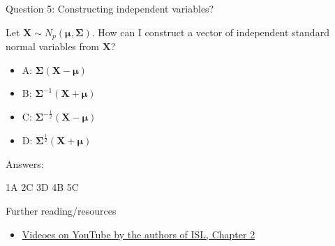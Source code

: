 \documentclass[ignorenonframetext,]{beamer}
\providecommand{\tightlist}{%
  \setlength{\itemsep}{0pt}\setlength{\parskip}{0pt}}
\begin{document}
\begin{frame}

\begin{block}{Question 5: Constructing independent variables?}

\vspace{2mm}

Let \(\mathbf{X}\sim N_p(\mathbf{\mu},\mathbf\Sigma)\). How can I
construct a vector of independent standard normal variables from
\(\mathbf{X}\)?

\begin{itemize}
\tightlist
\item
  A: \(\mathbf\Sigma(\mathbf{X}-\mathbf{\mu})\)
\item
  B: \(\mathbf\Sigma^{-1}(\mathbf{X}+\mathbf{\mu})\)
\item
  C: \(\mathbf\Sigma^{-\frac{1}{2}}(\mathbf{X}-\mathbf{\mu})\)
\item
  D: \(\mathbf\Sigma^{\frac{1}{2}}(\mathbf{X}+\mathbf{\mu})\)
\end{itemize}

\end{block}

\end{frame}

\begin{frame}

\begin{block}{Answers:}

1A 2C 3D 4B 5C

\end{block}

\end{frame}

\begin{frame}{ Further reading/resources}

\begin{itemize}
\tightlist
\item
  \href{https://www.youtube.com/playlist?list=PL5-da3qGB5IDvuFPNoSqheihPOQNJpzyy}{Videoes
  on YouTube by the authors of ISL, Chapter 2}
\end{itemize}

\end{frame}
\end{document}
